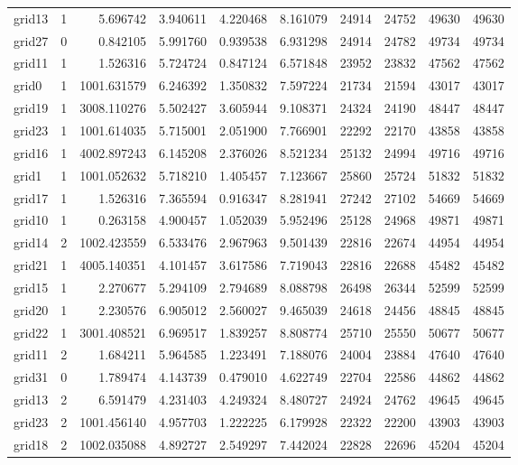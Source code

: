 \begin{longtable}{|l|r|r|r|r|r|r|r|r|r|}
grid13 & 1 & 5.696742 & 3.940611 & 4.220468 & 8.161079 & 24914 & 24752 & 49630 & 49630 \\
grid27 & 0 & 0.842105 & 5.991760 & 0.939538 & 6.931298 & 24914 & 24782 & 49734 & 49734 \\
grid11 & 1 & 1.526316 & 5.724724 & 0.847124 & 6.571848 & 23952 & 23832 & 47562 & 47562 \\
grid0 & 1 & 1001.631579 & 6.246392 & 1.350832 & 7.597224 & 21734 & 21594 & 43017 & 43017 \\
grid19 & 1 & 3008.110276 & 5.502427 & 3.605944 & 9.108371 & 24324 & 24190 & 48447 & 48447 \\
grid23 & 1 & 1001.614035 & 5.715001 & 2.051900 & 7.766901 & 22292 & 22170 & 43858 & 43858 \\
grid16 & 1 & 4002.897243 & 6.145208 & 2.376026 & 8.521234 & 25132 & 24994 & 49716 & 49716 \\
grid1 & 1 & 1001.052632 & 5.718210 & 1.405457 & 7.123667 & 25860 & 25724 & 51832 & 51832 \\
grid17 & 1 & 1.526316 & 7.365594 & 0.916347 & 8.281941 & 27242 & 27102 & 54669 & 54669 \\
grid10 & 1 & 0.263158 & 4.900457 & 1.052039 & 5.952496 & 25128 & 24968 & 49871 & 49871 \\
grid14 & 2 & 1002.423559 & 6.533476 & 2.967963 & 9.501439 & 22816 & 22674 & 44954 & 44954 \\
grid21 & 1 & 4005.140351 & 4.101457 & 3.617586 & 7.719043 & 22816 & 22688 & 45482 & 45482 \\
grid15 & 1 & 2.270677 & 5.294109 & 2.794689 & 8.088798 & 26498 & 26344 & 52599 & 52599 \\
grid20 & 1 & 2.230576 & 6.905012 & 2.560027 & 9.465039 & 24618 & 24456 & 48845 & 48845 \\
grid22 & 1 & 3001.408521 & 6.969517 & 1.839257 & 8.808774 & 25710 & 25550 & 50677 & 50677 \\
grid11 & 2 & 1.684211 & 5.964585 & 1.223491 & 7.188076 & 24004 & 23884 & 47640 & 47640 \\
grid31 & 0 & 1.789474 & 4.143739 & 0.479010 & 4.622749 & 22704 & 22586 & 44862 & 44862 \\
grid13 & 2 & 6.591479 & 4.231403 & 4.249324 & 8.480727 & 24924 & 24762 & 49645 & 49645 \\
grid23 & 2 & 1001.456140 & 4.957703 & 1.222225 & 6.179928 & 22322 & 22200 & 43903 & 43903 \\
grid18 & 2 & 1002.035088 & 4.892727 & 2.549297 & 7.442024 & 22828 & 22696 & 45204 & 45204 \\

\end{longtable}
